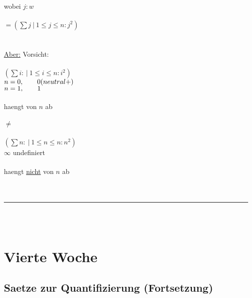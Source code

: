 \documentclass[18pt,a4paper]{article}
\newcommand{\tab}{\hspace*{2em}}
\begin{document}
\\
wobei $j: w$\\
\\
$= (\sum{j} \:\vert\: 1\leqslant j\leqslant n : j^2)$\\
\\
\\
\uline{Aber:} Vorsicht:\\
\\
$(\sum{i} : \:\vert\: 1\leqslant i\leqslant n : i^2 )$\\
$n=0 , \tab 0(neutral +)$\\
$n=1 , \tab 1$\\
\\
haengt von $n$ ab\\
\\
$\neq$\\
\\
$(\sum{n} : \:\vert\: 1\leqslant n\leqslant n : n^2 )$\\
$\infty$ undefiniert\\
\\
haengt \uline{nicht} von $n$ ab\\
\\
\\
\rule{\textwidth}{0.4mm}\\
\\

\section{Vierte Woche}

\subsection{Saetze zur Quantifizierung (Fortsetzung)}
\end{document}
